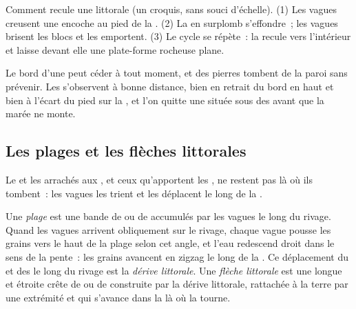 \begin{omfigure}
{\small Comment recule une  littorale (un croquis, sans souci
d'échelle). (1) Les vagues creusent une encoche au pied de la .
(2) La  en surplomb s'effondre~; les vagues brisent les blocs et les
emportent. (3) Le cycle se répète~: la  recule vers l'intérieur et
laisse devant elle une plate-forme rocheuse plane.}
\label{fig:g9:landforms:cliff-retreat}
\end{omfigure}

\begin{safety}
Le bord d'une  peut céder à tout moment, et des pierres tombent de
la paroi sans prévenir. Les  s'observent à bonne distance, bien en
retrait du bord en haut et bien à l'écart du pied sur la , et l'on
quitte une  située sous des  avant que la marée ne monte.
\end{safety}

\subsection{Les plages et les flèches littorales}

Le  et les  arrachés aux , et ceux qu'apportent les
, ne restent pas là où ils tombent~: les vagues les trient et les
déplacent le long de la .

\begin{definition}\label{def:g9:landforms:beach}
Une \emph{plage} est une bande de  ou de  accumulés
par les vagues le long du rivage. Quand les vagues arrivent obliquement sur
le rivage, chaque vague pousse les grains vers le haut de la plage selon
cet angle, et l'eau redescend droit dans le sens de la pente~: les grains
avancent en zigzag le long de la . Ce déplacement du  et des
 le long du rivage est la \emph{dérive littorale}.
Une \emph{flèche littorale} est une longue et étroite
crête de  ou de  construite par la dérive littorale, rattachée
à la terre par une extrémité et qui s'avance dans la  là où la 
tourne.
\end{definition}

